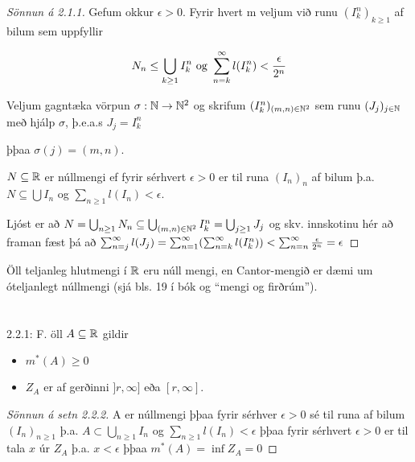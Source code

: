 \documentclass[12pt]{book}
\begin{document}
\begin{proof}[Sönnun á 2.1.1]

Gefum okkur $\epsilon > 0$. Fyrir hvert m veljum við runu $(I^n_k)_{k \geq 1}$ af bilum sem uppfyllir

\[N_n \leq \bigcup_{k \geq 1} I_k^n \text{ og } \sum_{n = {k}}^{\infty} l(I^n_k) < \frac{\epsilon}{2^n}\]

Veljum gagntæka vörpun $\sigma: \mathbb{N} \to \mathbb{N}^2$ og skrifum $(I^n_k)_{(m,n) \in \mathbb{N}^2}$ sem runu
$(J_j)_{j \in \mathbb{N}}$ með hjálp $\sigma$, þ.e.a.s $J_j = I^n_k$

þþaa $\sigma (j) = (m,n)$.

\begin{ath}
$N \subseteq \mathbb{R}$ er núllmengi ef fyrir sérhvert $\epsilon > 0$ er til runa $(I_n)_{n}$ af bilum þ.a.
$N \subseteq \bigcup I_n$ og $\sum_{n \geq 1} l(I_n) < \epsilon$.

\end{ath}

Ljóst er að $N = \bigcup_{n \geq 1} N_n \subseteq \bigcup_{(m,n) \in \mathbb{N}^2} I^n_k = \bigcup_{j \geq 1} J_j$
og skv. innskotinu hér að framan fæst þá að
$\sum_{n = {j}}^{\infty} l(J_j) = \sum_{n = 1}^{\infty} ( \sum_{n = {k}}^{\infty} l(I_k^n)) < \sum_{n = {n}}^{\infty} \frac{\epsilon}{2^n} = \epsilon$

\end{proof}

\begin{daemi}

Öll teljanleg hlutmengi í $\mathbb{R}$ eru núll mengi, en Cantor-mengið er dæmi um óteljanlegt núllmengi (sjá bls. 19 í bók og ``mengi og firðrúm'').
\end{daemi}


\section{}
\begin{ath}2.2.1:
F. öll $A \subseteq \mathbb{R}$ gildir
\begin{itemize}
\item $m^*(A) \geq 0$
\item $Z_A$ er af gerðinni $]r, \infty]$ eða $[r,\infty]$.
\end{itemize}
\end{ath}
\begin{proof}[Sönnun á setn 2.2.2]
A er núllmengi þþaa fyrir sérhver $\epsilon > 0$ sé til runa af bilum $(I_n)_{n \geq 1}$ þ.a. $A \subset \bigcup_{n \geq 1} I_n$ og $\sum_{n \geq 1} l(I_n) < \epsilon$ þþaa
fyrir sérhvert $\epsilon > 0$ er til tala $x$ úr $Z_A$ þ.a. $x < \epsilon$ þþaa $m^*(A) = \inf{Z_A} = 0$
\end{proof}
\end{document}
